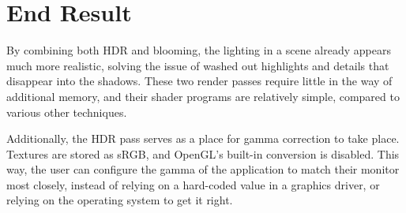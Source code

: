 \documentclass[11pt, oneside]{report}
\begin{document}
\section{End Result}
By combining both \gls{HDR} and blooming, the lighting in a scene already appears much more realistic, solving the issue of washed out highlights and details that disappear into the shadows. These two render passes require little in the way of additional memory, and their \gls{shader} programs are relatively simple, compared to various other techniques. 

Additionally, the \gls{HDR} pass serves as a place for gamma correction to take place. Textures are stored as sRGB, and \gls{OpenGL}'s built-in conversion is disabled. This way, the user can configure the gamma of the application to match their monitor most closely, instead of relying on a hard-coded value in a graphics driver, or relying on the operating system to get it right.
\end{document}
